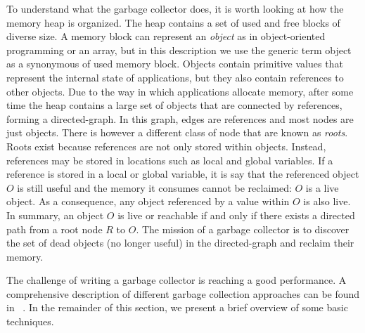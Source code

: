 To understand what the garbage collector does, it is worth looking at how the memory heap is organized.
The heap contains a set of used and free blocks of diverse size.
A memory block can represent an \textit{object} as in object-oriented programming or an array, but in this description we use the generic term object as a synonymous of used memory block. 
Objects contain primitive values that represent the internal state of applications, but they also contain references to other objects.
Due to the way in which applications allocate memory, after some time the heap contains a large set of objects that are connected by references, forming a directed-graph.
In this graph, edges are references and most nodes are just objects.
There is however a different class of node that are known as \textit{roots}.
Roots exist because references are not only stored within objects.
Instead, references may be stored in locations such as local and global variables.
If a reference is stored in a local or global variable, it is say that the referenced object $O$ is still useful and the memory it consumes cannot be reclaimed: $O$ is a live object.
As a consequence, any object referenced by a value within $O$ is also live.
In summary, an object $O$ is live or reachable if and only if there exists a directed path from a root node $R$ to $O$.
The mission of a garbage collector is to discover the set of dead objects (no longer useful) in the directed-graph and reclaim their memory.

The challenge of writing a garbage collector is reaching a good performance.
A comprehensive description of different garbage collection approaches can be found in ~\cite{Richard2012}.
In the remainder of this section, we present a brief overview of some basic techniques.

